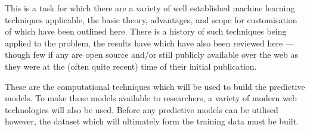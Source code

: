 This is a task for which there are a variety of well established machine learning techniques applicable, the basic theory, advantages, and scope for customisation of which have been outlined here. There is a history of such techniques being applied to the problem, the results have which have also been reviewed here --- though few if any are open source and/or still publicly available over the web as they were at the (often quite recent) time of their initial publication.

These are the computational techniques which will be used to build the predictive models. To make these models available to researchers, a variety of modern web technologies will also be used. Before any predictive models can be utilised however, the dataset which will ultimately form the training data must be built.